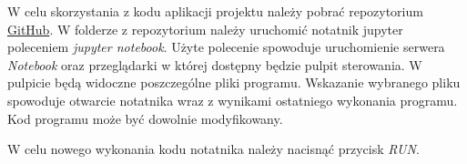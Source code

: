 \documentclass[11pt]{report}
\begin{document}
    W celu skorzystania z kodu aplikacji projektu należy pobrać repozytorium \href{https://github.com/mijapa/GDELT}{GitHub}.
    W folderze z repozytorium należy uruchomić notatnik jupyter poleceniem \textit{jupyter notebook}.
    Użyte polecenie spowoduje uruchomienie serwera \textit{Notebook} oraz przeglądarki w której dostępny będzie pulpit sterowania.
    W pulpicie będą widoczne poszczególne pliki programu.
    Wskazanie wybranego pliku spowoduje otwarcie notatnika wraz z wynikami ostatniego wykonania programu.
    Kod programu może być dowolnie modyfikowany.

    W celu nowego wykonania kodu notatnika należy nacisnąć przycisk \textit{RUN}.



    \newpage
    \printbibliography[title={Bibliografia}]
\end{document}
